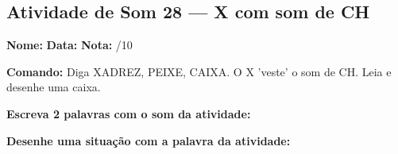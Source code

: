 \subsection{Atividade de Som 28 --- X com som de CH}
\begin{exercicio}



\noindent\textbf{Nome:} \underline{\hspace{3.2cm}} \quad \textbf{Data:} \underline{\hspace{1.6cm}} \quad \textbf{Nota:} \underline{\hspace{0.9cm}}/10


\noindent\textbf{Comando:} Diga XADREZ, PEIXE, CAIXA. O X 'veste' o som de CH. Leia e desenhe uma caixa.


\begin{center}
\end{center}

\noindent\textbf{Escreva 2 palavras com o som da atividade:}

\begin{center}
  \underline{\hspace{3cm}} \quad \underline{\hspace{3cm}}
\end{center}

\noindent\textbf{Desenhe uma situação com a palavra da atividade:}

\begin{center}
\end{center}

\end{exercicio}




